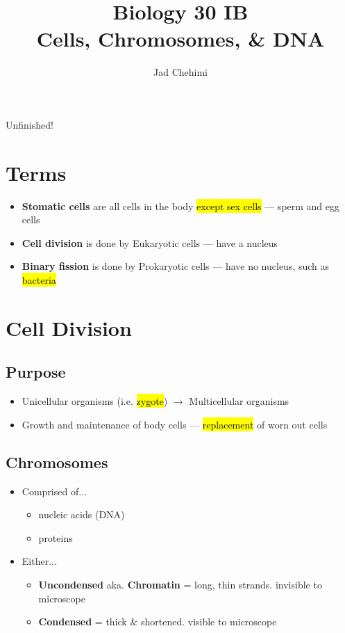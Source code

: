 \documentclass[a4paper,12pt]{article}
\title{Biology 30 IB \\ Cells, Chromosomes, \& DNA}
\author{Jad Chehimi}
\begin{document}
\maketitle

\begin{center}
\Huge
Unfinished!
\normalsize
\end{center}

\tableofcontents

\pagebreak

\section{Terms}
\begin{itemize}
    \item{\textbf{Stomatic cells} are all cells in the body \hl{except sex cells} --- sperm and egg cells}
    \item{\textbf{Cell division} is done by Eukaryotic cells --- have a nucleus}
    \item{\textbf{Binary fission} is done by Prokaryotic cells --- have no nucleus, such as \hl{bacteria}}
\end{itemize}

\section{Cell Division}
\subsection{Purpose}
\begin{itemize}
    \item{Unicellular organisms (i.e. \hl{zygote}) $\longrightarrow$ Multicellular organisms}
    \item{Growth and maintenance of body cells --- \hl{replacement} of worn out cells}
\end{itemize}

\subsection{Chromosomes}
\begin{itemize}
    \item{
            Comprised of...
            \begin{itemize}
                \item{nucleic acids (DNA)}
                \item{proteins}
            \end{itemize}
        }
    \item{
            Either...
            \begin{itemize}
                \item{\textbf{Uncondensed} aka. \textbf{Chromatin} = long, thin strands. invisible to microscope}
                \item{\textbf{Condensed} = thick \& shortened. visible to microscope}
            \end{itemize}
        }
\end{itemize}
\end{document}
